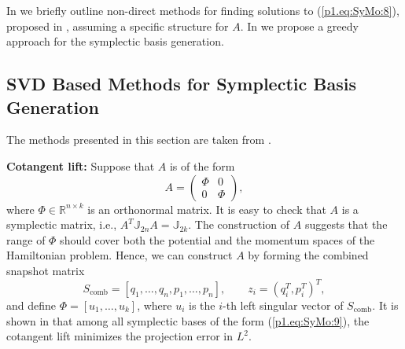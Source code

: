 In  we briefly outline non-direct methods for finding solutions to (\ref{p1.eq:SyMo:8}), proposed in \cite{doi:10.1137/140978922}, assuming a specific structure for $A$. In  we propose a greedy approach for the symplectic basis generation.

\subsection{SVD Based Methods for Symplectic Basis Generation} \label{p1.chap:SyMo.PrSy:2} 
The methods presented in this section are taken from \cite{doi:10.1137/140978922}. 


{\bf Cotangent lift:} Suppose that $A$ is of the form
\begin{equation} \label{p1.eq:SyMo:9}
	A = 
	\begin{pmatrix}
		\Phi & 0 \\
		0 & \Phi
	\end{pmatrix},
\end{equation}
where $\Phi \in \mathbb{R}^{n\times k}$ is an orthonormal matrix. It is easy to check that $A$ is a symplectic matrix, i.e., $A^T \mathbb J_{2n} A = \mathbb J_{2k}$. The construction of $A$ suggests that the range of $\Phi$ should cover both the potential and the momentum spaces of the Hamiltonian problem. Hence, we can construct $A$ by forming the combined snapshot matrix
\begin{equation} \label{p1.eq:SyMo:10}
	S_{\text{comb}} = [q_1,\dots,q_n,p_1,\dots,p_n], \qquad z_i = (q_i^T,p_i^T)^T,
\end{equation}
and define $\Phi=[u_1,\dots,u_k]$, where $u_i$ is the $i$-th left singular vector of $S_{\text{comb}}$. It is shown in \cite{doi:10.1137/140978922} that among all symplectic bases of the form (\ref{p1.eq:SyMo:9}), the cotangent lift minimizes the projection error in $L^2$.


